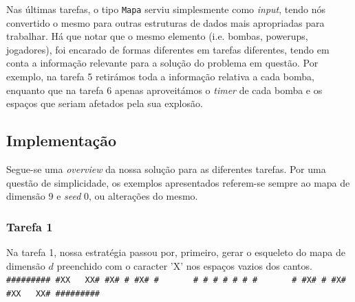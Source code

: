 \documentclass[a4paper]{article}
\begin{document}
    Nas últimas tarefas, o tipo \texttt{Mapa} serviu simplesmente como \textit{input}, tendo nós
    convertido o mesmo para outras estruturas de dados mais apropriadas para trabalhar.
    Há que notar que o mesmo elemento (i.e. bombas, powerups, jogadores), foi encarado 
    de formas diferentes em tarefas diferentes, tendo em conta a informação relevante
    para a solução do problema em questão. Por exemplo, na tarefa 5 retirámos
    toda a informação relativa a cada bomba, enquanto que na tarefa 6 apenas aproveitámos
    o \textit{timer} de cada bomba e os espaços que seriam afetados pela sua explosão.
\pagebreak












\subsection{Implementação}

    \hspace{0.54cm}Segue-se uma \textit{overview} da nossa solução para as diferentes tarefas. Por uma questão
    de simplicidade, os exemplos apresentados referem-se sempre ao mapa de dimensão 9 e \textit{seed} 0,
    ou alterações do mesmo.
    \subsubsection{Tarefa 1}
       \hspace{0.54cm} Na tarefa 1, nossa estratégia passou por, primeiro, gerar o esqueleto do mapa de dimensão $d$ 
        preenchido com o caracter 'X' nos espaços vazios dos cantos. \hspace{5cm}
        \linebreak
        \texttt{
        \linebreak \#\#\#\#\#\#\#\#\#
        \linebreak \#XX\ \ \ XX\#
        \linebreak \#X\# \# \#X\#
        \linebreak \#\ \ \ \ \ \ \ \#
        \linebreak \# \# \# \# \#
        \linebreak \#\ \ \ \ \ \ \ \#
        \linebreak \#X\# \# \#X\#
        \linebreak \#XX\ \ \ XX\#
        \linebreak \#\#\#\#\#\#\#\#\#}
        \linebreak
\end{document}
